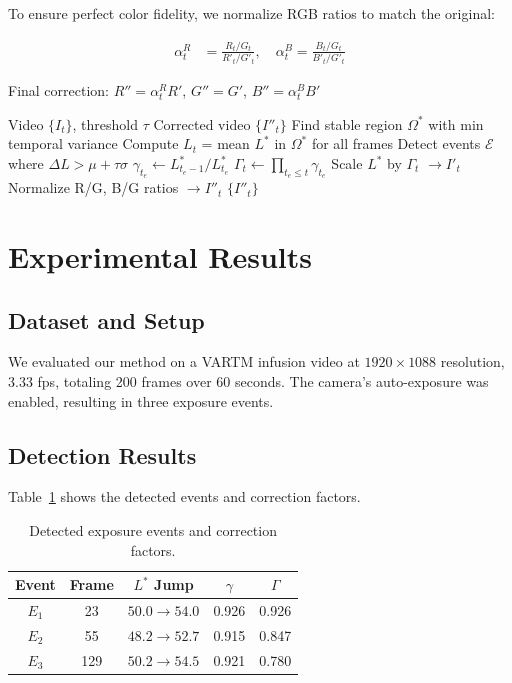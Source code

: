 \documentclass[conference]{IEEEtran}
\begin{document}
To ensure perfect color fidelity, we normalize RGB ratios to match the original:

\begin{align}
\alpha^R_t &= \frac{R_t / G_t}{R'_t / G'_t}, \quad
\alpha^B_t = \frac{B_t / G_t}{B'_t / G'_t}
\end{align}

Final correction: $R'' = \alpha^R_t R'$, $G'' = G'$, $B'' = \alpha^B_t B'$

\begin{algorithm}[t]
\caption{Two-Step Exposure Correction}
\label{alg:complete}
\begin{algorithmic}[1]
\REQUIRE Video $\{I_t\}$, threshold $\tau$
\ENSURE Corrected video $\{I''_t\}$
\STATE Find stable region $\Omega^*$ with min temporal variance
\STATE Compute $L_t$ = mean $L^*$ in $\Omega^*$ for all frames
\STATE Detect events $\mathcal{E}$ where $\Delta L > \mu + \tau\sigma$
    \STATE $\gamma_{t_e} \leftarrow L^*_{t_e-1} / L^*_{t_e}$
\ENDFOR
{}
    \STATE $\Gamma_t \leftarrow \prod_{t_e \leq t} \gamma_{t_e}$
    \STATE Scale $L^*$ by $\Gamma_t$ $\rightarrow I'_t$
    \STATE Normalize R/G, B/G ratios $\rightarrow I''_t$
\ENDFOR
\RETURN $\{I''_t\}$
\end{algorithmic}
\end{algorithm}

\section{Experimental Results}
\label{sec:results}

\subsection{Dataset and Setup}

We evaluated our method on a VARTM infusion video at $1920 \times 1088$ resolution, 3.33 fps, totaling 200 frames over 60 seconds. The camera's auto-exposure was enabled, resulting in three exposure events.

\subsection{Detection Results}

Table~\ref{tab:detection_results} shows the detected events and correction factors.

\begin{table}[t]
\centering
\caption{Detected exposure events and correction factors.}
\label{tab:detection_results}
\begin{tabular}{ccccc}
\toprule
\textbf{Event} & \textbf{Frame} & \textbf{$L^*$ Jump} & \textbf{$\gamma$} & \textbf{$\Gamma$} \\
\midrule
$E_1$ & 23 & $50.0 \rightarrow 54.0$ & 0.926 & 0.926 \\
$E_2$ & 55 & $48.2 \rightarrow 52.7$ & 0.915 & 0.847 \\
$E_3$ & 129 & $50.2 \rightarrow 54.5$ & 0.921 & 0.780 \\
\bottomrule
\end{tabular}
\end{table}
\end{document}
